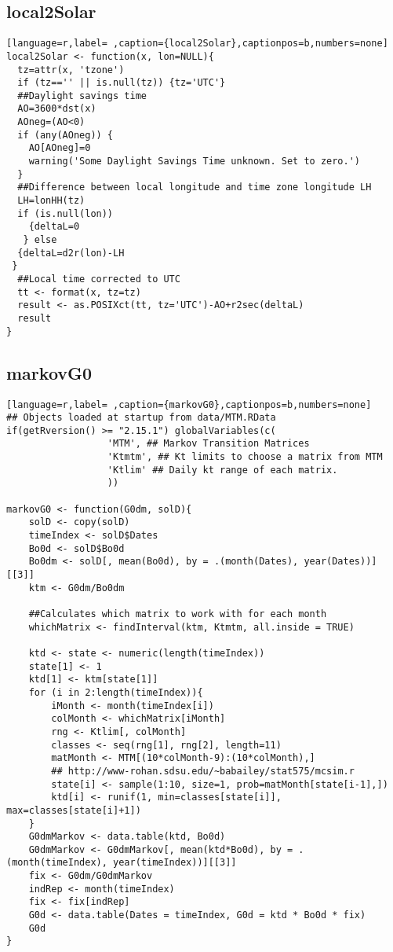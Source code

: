 \subsection{local2Solar}
\label{sec:org90853b7}
\label{subsec:local2solar}
\begin{lstlisting}[language=r,label= ,caption={local2Solar},captionpos=b,numbers=none]
local2Solar <- function(x, lon=NULL){	
  tz=attr(x, 'tzone')
  if (tz=='' || is.null(tz)) {tz='UTC'}
  ##Daylight savings time
  AO=3600*dst(x)
  AOneg=(AO<0)
  if (any(AOneg)) {
    AO[AOneg]=0
    warning('Some Daylight Savings Time unknown. Set to zero.')
  }
  ##Difference between local longitude and time zone longitude LH
  LH=lonHH(tz)
  if (is.null(lon)) 
    {deltaL=0
   } else
  {deltaL=d2r(lon)-LH
 }
  ##Local time corrected to UTC
  tt <- format(x, tz=tz)
  result <- as.POSIXct(tt, tz='UTC')-AO+r2sec(deltaL)
  result
}
\end{lstlisting}
\subsection{markovG0}
\label{sec:orgd765a0d}
\label{subsec:markovg0}
\begin{lstlisting}[language=r,label= ,caption={markovG0},captionpos=b,numbers=none]
## Objects loaded at startup from data/MTM.RData
if(getRversion() >= "2.15.1") globalVariables(c(
                  'MTM', ## Markov Transition Matrices
                  'Ktmtm', ## Kt limits to choose a matrix from MTM
                  'Ktlim' ## Daily kt range of each matrix.
                  ))

markovG0 <- function(G0dm, solD){
    solD <- copy(solD)
    timeIndex <- solD$Dates
    Bo0d <- solD$Bo0d
    Bo0dm <- solD[, mean(Bo0d), by = .(month(Dates), year(Dates))][[3]]
    ktm <- G0dm/Bo0dm

    ##Calculates which matrix to work with for each month
    whichMatrix <- findInterval(ktm, Ktmtm, all.inside = TRUE)

    ktd <- state <- numeric(length(timeIndex))
    state[1] <- 1
    ktd[1] <- ktm[state[1]]
    for (i in 2:length(timeIndex)){
        iMonth <- month(timeIndex[i])
        colMonth <- whichMatrix[iMonth]
        rng <- Ktlim[, colMonth]
        classes <- seq(rng[1], rng[2], length=11)
        matMonth <- MTM[(10*colMonth-9):(10*colMonth),]
        ## http://www-rohan.sdsu.edu/~babailey/stat575/mcsim.r
        state[i] <- sample(1:10, size=1, prob=matMonth[state[i-1],])
        ktd[i] <- runif(1, min=classes[state[i]], max=classes[state[i]+1])
    }
    G0dmMarkov <- data.table(ktd, Bo0d)
    G0dmMarkov <- G0dmMarkov[, mean(ktd*Bo0d), by = .(month(timeIndex), year(timeIndex))][[3]]
    fix <- G0dm/G0dmMarkov
    indRep <- month(timeIndex)
    fix <- fix[indRep]
    G0d <- data.table(Dates = timeIndex, G0d = ktd * Bo0d * fix)
    G0d
}
\end{lstlisting}
